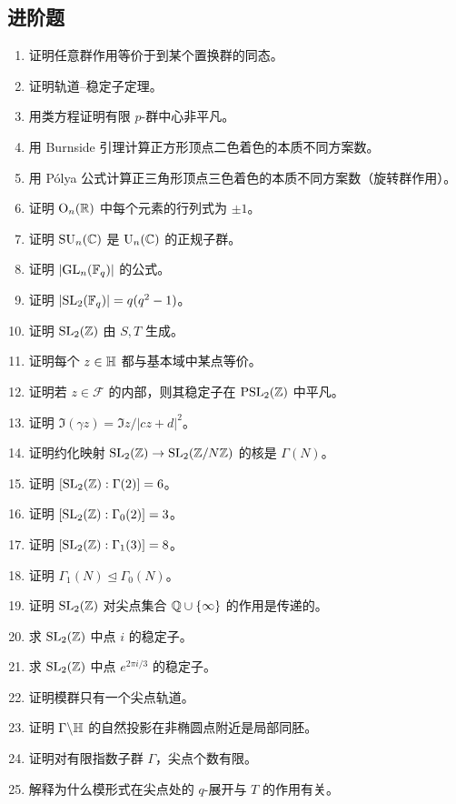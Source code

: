 \subsection*{进阶题}
\begin{enumerate}[resume, label=\textbf{\arabic*.}, leftmargin=*, itemsep=0.5em]
\item \medium 证明任意群作用等价于到某个置换群的同态。
\item \medium 证明轨道--稳定子定理。
\item \medium 用类方程证明有限 $p$-群中心非平凡。
\item \medium 用 Burnside 引理计算正方形顶点二色着色的本质不同方案数。
\item \medium 用 P\'olya 公式计算正三角形顶点三色着色的本质不同方案数（旋转群作用）。
\item \medium 证明 $\mathrm{O}_n(\mathbb{R})$ 中每个元素的行列式为 $\pm1$。
\item \medium 证明 $\mathrm{SU}_n(\mathbb{C})$ 是 $\mathrm{U}_n(\mathbb{C})$ 的正规子群。
\item \medium 证明 $|\mathrm{GL}_n(\mathbb{F}_q)|$ 的公式。
\item \medium 证明 $|\mathrm{SL}_2(\mathbb{F}_q)|=q(q^2-1)$。
\item \medium 证明 $\mathrm{SL}_2(\mathbb{Z})$ 由 $S,T$ 生成。
\item \medium 证明每个 $z\in\mathbb{H}$ 都与基本域中某点等价。
\item \medium 证明若 $z\in\mathcal F$ 的内部，则其稳定子在 $\mathrm{PSL}_2(\mathbb{Z})$ 中平凡。
\item \medium 证明 $\Im(\gamma z)=\Im z/|cz+d|^2$。
\item \medium 证明约化映射 $\mathrm{SL}_2(\mathbb{Z})\to \mathrm{SL}_2(\mathbb{Z}/N\mathbb{Z})$ 的核是 $\Gamma(N)$。
\item \medium 证明 $[\mathrm{SL}_2(\mathbb{Z}):\Gamma(2)]=6$。
\item \medium 证明 $[\mathrm{SL}_2(\mathbb{Z}):\Gamma_0(2)]=3$。
\item \medium 证明 $[\mathrm{SL}_2(\mathbb{Z}):\Gamma_1(3)]=8$。
\item \medium 证明 $\Gamma_1(N)\trianglelefteq \Gamma_0(N)$。
\item \medium 证明 $\mathrm{SL}_2(\mathbb{Z})$ 对尖点集合 $\mathbb{Q}\cup\{\infty\}$ 的作用是传递的。
\item \medium 求 $\mathrm{SL}_2(\mathbb{Z})$ 中点 $i$ 的稳定子。
\item \medium 求 $\mathrm{SL}_2(\mathbb{Z})$ 中点 $e^{2\pi i/3}$ 的稳定子。
\item \medium 证明模群只有一个尖点轨道。
\item \medium 证明 $\Gamma\backslash\mathbb{H}$ 的自然投影在非椭圆点附近是局部同胚。
\item \medium 证明对有限指数子群 $\Gamma$，尖点个数有限。
\item \medium 解释为什么模形式在尖点处的 $q$-展开与 $T$ 的作用有关。
\end{enumerate}
